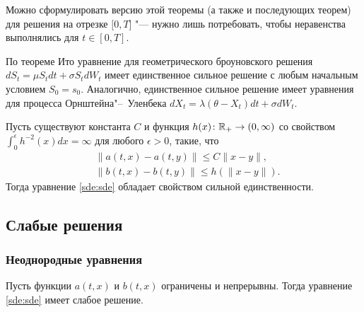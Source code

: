 \begin{remark}
Можно сформулировать версию этой теоремы (а также и последующих теорем) для решения на отрезке $[0,T$] "--- нужно лишь потребовать, чтобы неравенства выполнялись для $t\in[0,T]$.
\end{remark}

\begin{example}
По теореме Ито уравнение для геометрического броуновского решения $d S_t = \mu S_t dt + \sigma S_t dW_t$  имеет единственное сильное решение  с любым начальным условием $S_0=s_0$.
Аналогично, единственное сильное решение имеет уравнения для процесса Орнштейна"--~Уленбека $d X_t = \lambda(\theta- X_t) dt + \sigma dW_t$.
\end{example}

\begin{theorem}
\label{sde:t:yw-2}
Пусть существуют константа $C$ и функция $h(x)\colon \mathbb{R}_+\to(0,\infty)$ со свойством $\int_0^\epsilon h^{-2}(x) dx = \infty$ для любого $\epsilon >0$, такие, что
\begin{align*}
&\|a(t,x) - a(t,y)\| \le C\|x-y\|,\\
&\|b(t,x) - b(t,y)\| \le h(\|x-y\|).
\end{align*}
Тогда уравнение \eqref{sde:sde} обладает свойством сильной единственности.
\end{theorem}



\subsection{Слабые решения}
\subsubsection{Неоднородные уравнения}

\begin{theorem}[А.\,B.~Скороход]
Пусть функции $a(t,x)$ и $b(t,x)$ ограничены и непрерывны.
Тогда уравнение \eqref{sde:sde} имеет слабое решение.
\end{theorem}

